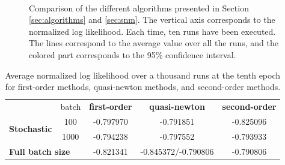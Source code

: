 \documentclass[conference]{IEEEtran}
\begin{document}
\begin{figure}[t]
\vspace{-1cm}
    \centering
    ~
    ~
    \vspace{-0.2cm}
    \caption{Comparison of the different algorithms presented in Section \ref{sec:algorithms} and \ref{sec:snm}. The vertical axis corresponds to the normalized log likelihood. Each time, ten runs have been executed. The lines correspond to the average value over all the runs, and the colored part corresponds to the 95\% confidence interval.}
    \label{fig:comparison_algo}
    \vspace{-0.5cm}
\end{figure}

\begin{table}
\centering
\renewcommand\arraystretch{1.2}
\begin{tabular}{lc|ccc}
&\multicolumn{1}{c}{batch} & {\bf first-order} & {\bf quasi-newton} & {\bf second-order} \\ \cline{3-5}
\multirow{ 2}{*}{\bf Stochastic} & 100 & -0.797970 & -0.791851 & -0.825096 \\
& 1000 & -0.794238 & -0.797552 & -0.793933 \\
\multicolumn{2}{l|}{\bf Full batch size}  & -0.821341 & -0.845372/-0.790806 & -0.790806
\end{tabular}
\caption{\label{tab:comparison_algo} Average normalized log likelihood over a thousand runs at the tenth epoch for first-order methods, quasi-newton methods, and second-order methods.}
\vspace{-1cm}
\end{table}
\end{document}
